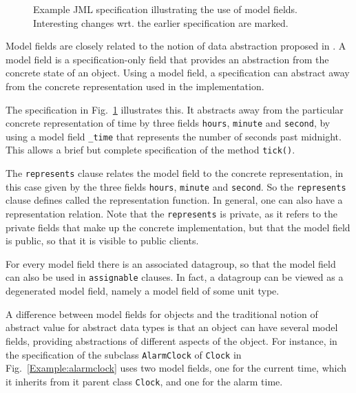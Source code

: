 \documentclass{llncs}
\begin{document}

\begin{figure}[tbp] \label{Example:model}
%

%
\vspace*{-2ex} %
\caption{Example JML specification illustrating the use of model fields. Interesting changes wrt. the earlier specification are marked.}
\end{figure}


Model fields are closely related to the notion of data abstraction proposed in 
\cite{Hoare72}.  A model field is a specification-only field that provides an 
abstraction from the concrete state of an object.  Using a model field, a 
specification can abstract away from the concrete representation used in 
the implementation.

The specification in Fig.~\ref{Example:model} illustrates this.
It abstracts away from the particular concrete representation of time
by three fields \texttt{hours}, \texttt{minute} and \texttt{second},
by using a model field \texttt{\_time} that represents the number of seconds
past midnight.
This allows a brief but complete specification of the method \texttt{tick()}.

The \texttt{represents} clause relates the model field to the concrete representation,
in this case given by the three fields  \texttt{hours}, \texttt{minute} and 
\texttt{second}. So the \texttt{represents} clause defines called the 
representation function. In general, one can also have a representation relation.
Note that the \texttt{represents} is private, as it refers to the private
fields that make up the concrete implementation, but that the model field
is public, so that it is visible to public clients.

For every model field there is an associated datagroup, so that the 
model field can also be used in \texttt{assignable} clauses.
In fact, a datagroup can be viewed as a degenerated model field, namely
a model field of some unit type.

A difference between model fields for objects and the traditional notion of
abstract value for abstract data types is that an object can have several
model fields, providing abstractions of different aspects of the object.
For instance, in the specification of the subclass \texttt{AlarmClock}
of \texttt{Clock} in Fig.~\ref{Example:alarmclock} uses 
two model fields, one for the current time, which it inherits from
it parent class \texttt{Clock}, and one for the alarm time.
\end{document}
